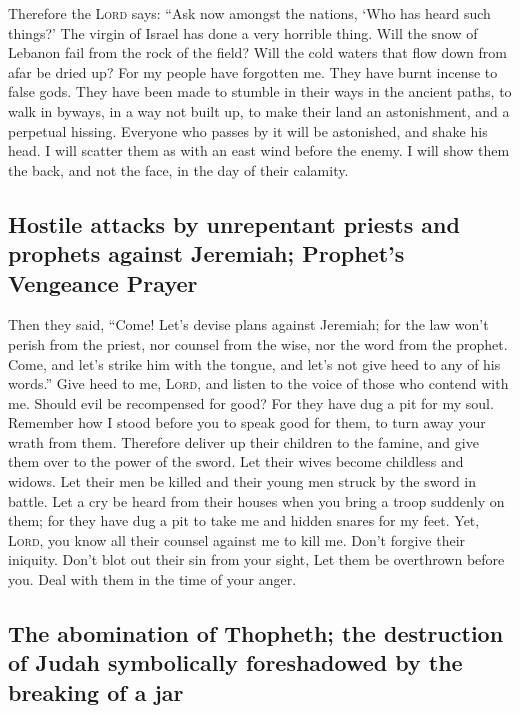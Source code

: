  Therefore the \textsc{Lord} says: ``Ask now amongst the
nations, `Who has heard such things?' The virgin of Israel has done a
very horrible thing.  Will the snow of Lebanon fail from
the rock of the field? Will the cold waters that flow down from afar be
dried up?  For my people have forgotten me. They have
burnt incense to false gods. They have been made to stumble in their
ways in the ancient paths, to walk in byways, in a way not built up,
 to make their land an astonishment, and a perpetual
hissing. Everyone who passes by it will be astonished, and shake his
head.  I will scatter them as with an east wind before
the enemy. I will show them the back, and not the face, in the day of
their calamity.

\hypertarget{hostile-attacks-by-unrepentant-priests-and-prophets-against-jeremiah-prophets-vengeance-prayer}{%
\subsection{Hostile attacks by unrepentant priests and prophets against
Jeremiah; Prophet's Vengeance
Prayer}\label{hostile-attacks-by-unrepentant-priests-and-prophets-against-jeremiah-prophets-vengeance-prayer}}

 Then they said, ``Come! Let's devise plans against
Jeremiah; for the law won't perish from the priest, nor counsel from the
wise, nor the word from the prophet. Come, and let's strike him with the
tongue, and let's not give heed to any of his words.'' 
Give heed to me, \textsc{Lord}, and listen to the voice of those who
contend with me.  Should evil be recompensed for good?
For they have dug a pit for my soul. Remember how I stood before you to
speak good for them, to turn away your wrath from them. 
Therefore deliver up their children to the famine, and give them over to
the power of the sword. Let their wives become childless and widows. Let
their men be killed and their young men struck by the sword in battle.
 Let a cry be heard from their houses when you bring a
troop suddenly on them; for they have dug a pit to take me and hidden
snares for my feet.  Yet, \textsc{Lord}, you know all
their counsel against me to kill me. Don't forgive their iniquity. Don't
blot out their sin from your sight, Let them be overthrown before you.
Deal with them in the time of your anger.

\hypertarget{the-abomination-of-thopheth-the-destruction-of-judah-symbolically-foreshadowed-by-the-breaking-of-a-jar}{%
\subsection{The abomination of Thopheth; the destruction of Judah
symbolically foreshadowed by the breaking of a
jar}\label{the-abomination-of-thopheth-the-destruction-of-judah-symbolically-foreshadowed-by-the-breaking-of-a-jar}}

